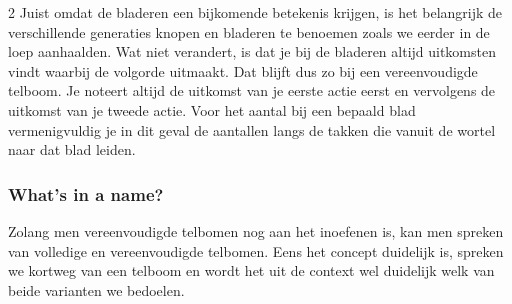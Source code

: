 \begin{multicols}{2}
Juist omdat de bladeren een bijkomende betekenis krijgen, is het belangrijk de verschillende generaties knopen en bladeren te benoemen zoals we eerder in de loep aanhaalden. Wat niet verandert, is dat je bij de bladeren altijd uitkomsten vindt waarbij de volgorde uitmaakt. Dat blijft dus zo bij een vereenvoudigde telboom. Je noteert altijd de uitkomst van je eerste actie eerst en vervolgens de uitkomst van je tweede actie. Voor het aantal bij een bepaald blad vermenigvuldig je in dit geval de aantallen langs de takken die vanuit de wortel naar dat blad leiden.

\subsubsection{What’s in a name?}
Zolang men vereenvoudigde telbomen nog aan het inoefenen is, kan men spreken van volledige en vereenvoudigde telbomen. Eens het concept duidelijk is, spreken we kortweg van een telboom en wordt het uit de context wel duidelijk welk van beide varianten we bedoelen.


\end{multicols}
